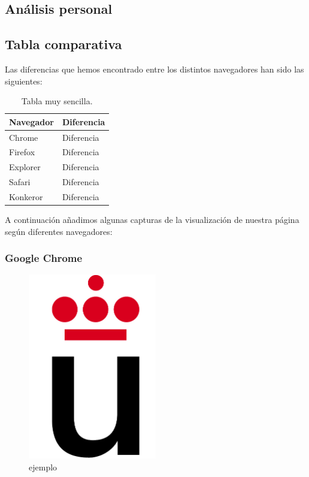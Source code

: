 \subsection{Análisis personal}
\subsection{Tabla comparativa}
Las diferencias que hemos encontrado entre los distintos navegadores han sido las siguientes:\\
\begin{table}[htbp]
	\begin{center}
		\begin{tabular}{|l|l|}
			\hline
			Navegador & Diferencia \\
			\hline \hline
			Chrome & Diferencia \\ \hline
			Firefox & Diferencia \\ \hline
			Explorer & Diferencia \\ \hline
			Safari & Diferencia \\ \hline
			Konkeror & Diferencia \\ \hline
		\end{tabular}
		\caption{Tabla muy sencilla.}
		\label{tabla:sencilla}
	\end{center}
\end{table}
A continuación añadimos algunas capturas de la visualización de nuestra página según diferentes navegadores:
\subsubsection{Google Chrome}
\begin{figure}[h]
	\centering
	\includegraphics[width=0.50\textwidth]{./Fotos/logoURJC.jpg}
	\caption{ejemplo}
	\label{fig: ejemplo}
\end{figure}
